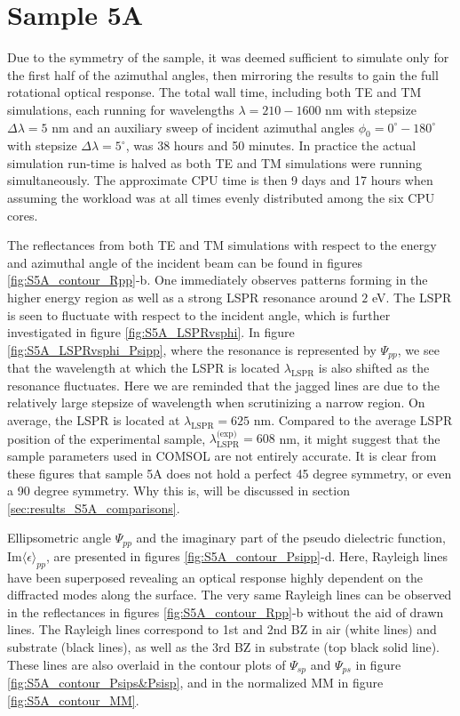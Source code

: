 \clearpage
\section{Sample 5A}
Due to the symmetry of the sample, it was deemed sufficient to simulate only for the first half of the azimuthal angles, then mirroring the results to gain the full rotational optical response. The total wall time, including both TE and TM simulations, each running for wavelengths $\lambda=210-1600$ nm with stepsize $\Delta\lambda=5$ nm and an auxiliary sweep of incident azimuthal angles $\phi_0=0^\circ-180^\circ$ with stepsize $\Delta\lambda=5^\circ$, was 38 hours and 50 minutes. In practice the actual simulation run-time is halved as both TE and TM simulations were running simultaneously. The approximate CPU time is then 9 days and 17 hours when assuming the workload was at all times evenly distributed among the six CPU cores.

The reflectances from both TE and TM simulations with respect to the energy and azimuthal angle of the incident beam can be found in figures \ref{fig:S5A_contour_Rpp}-b. One immediately observes patterns forming in the higher energy region as well as a strong LSPR resonance around $2$ eV. The LSPR is seen to fluctuate with respect to the incident angle, which is further investigated in figure \ref{fig:S5A_LSPRvsphi}. In figure \ref{fig:S5A_LSPRvsphi_Psipp}, where the resonance is represented by $\Psi_{pp}$, we see that the wavelength at which the LSPR is located $\lambda_{\text{LSPR}}$ is also shifted as the resonance fluctuates. Here we are reminded that the jagged lines are due to the relatively large stepsize of wavelength when scrutinizing a narrow region. On average, the LSPR is located at $\lambda_{\text{LSPR}}=625$ nm. Compared to the average LSPR position of the experimental sample, $\lambda_{\text{LSPR}}^\text{(exp)}=608$ nm, it might suggest that the sample parameters used in COMSOL are not entirely accurate. It is clear from these figures that sample 5A does not hold a perfect 45 degree symmetry, or even a 90 degree symmetry. Why this is, will be discussed in section \ref{sec:results_S5A_comparisons}.

Ellipsometric angle $\Psi_{pp}$ and the imaginary part of the pseudo dielectric function, $\text{Im}\langle\epsilon\rangle_{pp}$, are presented in figures \ref{fig:S5A_contour_Psipp}-d. Here, Rayleigh lines have been superposed revealing an optical response highly dependent on the diffracted modes along the surface. The very same Rayleigh lines can be observed in the reflectances in figures \ref{fig:S5A_contour_Rpp}-b without the aid of drawn lines. The Rayleigh lines correspond to 1st and 2nd BZ in air (white lines) and substrate (black lines), as well as the 3rd BZ in substrate (top black solid line). These lines are also overlaid in the contour plots of $\Psi_{sp}$ and $\Psi_{ps}$ in figure \ref{fig:S5A_contour_Psips&Psisp}, and in the normalized MM in figure \ref{fig:S5A_contour_MM}. 

